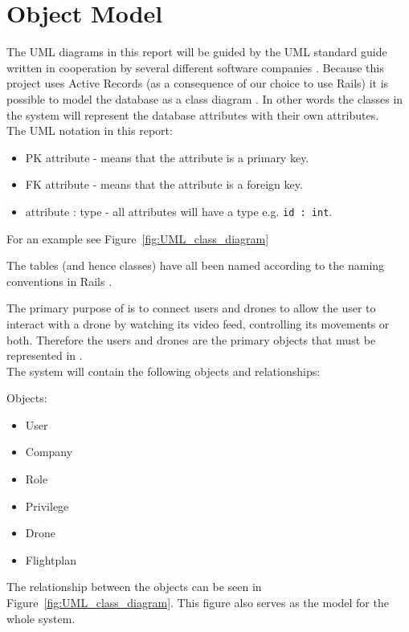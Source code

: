 \section{Object Model}
\label{section:uml_notation}
\label{subsec:objects}

The UML diagrams in this report will be guided by the UML standard guide written in cooperation by several different software companies \citep{UML_notation}.
Because this project uses Active Records (as a consequence of our choice to use Rails) it is possible to model the database as a class diagram \citep{active_records}.
In other words the classes in the system will represent the database attributes with their own attributes. \\

The UML notation in this report:
\begin{itemize}
    \item PK attribute - means that the attribute is a primary key.
    \item FK attribute - means that the attribute is a foreign key.
    \item attribute : type - all attributes will have a type e.g. \verb+id : int+.
\end{itemize}

For an example see Figure~\ref{fig:UML_class_diagram}

The tables (and hence classes) have all been named according to the naming conventions in Rails \citep{ror_naming_convention}.

The primary purpose of \projectname{} is to connect users and drones to allow the user to interact with a drone by watching its video feed, controlling its movements or both.
Therefore the users and drones are the primary objects that must be represented in \projectname{}. \\

The system will contain the following objects and relationships:

Objects:
\begin{itemize}
    \item User
    \item Company
    \item Role
    \item Privilege
    \item Drone
    \item Flightplan
\end{itemize}

The relationship between the objects can be seen in Figure~\ref{fig:UML_class_diagram}.
This figure also serves as the model for the whole system. \\

